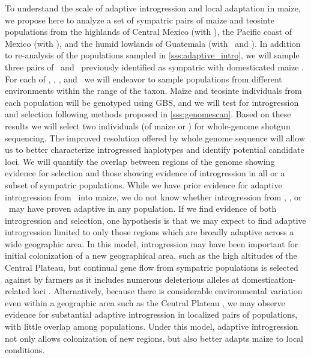 To understand the scale of adaptive introgression and local adaptation in maize, we propose here to analyze a set of sympatric pairs of maize and teosinte populations from the highlands of Central Mexico (with \zm), the Pacific coast of Mexico (with \zp), and the humid lowlands of Guatemala (with \zl\ and \zh). 
In addition to re-analysis of the populations sampled in \ref{sss:adaptive_intro}, we will sample three pairs of \zm\ and \zp\ previously identified as sympatric with domesticated maize \citep{hufford2010genetic, Hufford2013}.  
For each of \zl, \zm, \zp, and \zh\ we will endeavor to sample populations from different environments within the range of the taxon.
Maize and teosinte individuals from each population will be genotyped using GBS, and we will test for introgression and selection following methods proposed in \ref{sss:genomescan}.
Based on these results we will select two individuals (of maize or \zm) for whole-genome shotgun sequencing. 
The improved resolution offered by whole genome sequence will allow us to better characterize introgressed haplotypes and identify potential candidate loci.
We will quantify the overlap between regions of the genome showing evidence for selection and those showing evidence of introgression in all or a subset of sympatric populations.  
While we have prior evidence for adaptive introgression from \zm\ into maize, we do not know whether introgression from \zp, \zl, or \zh\ may have proven adaptive in any population.
If we find evidence of both introgression and selection, one hypothesis is that we may expect to find adaptive introgression limited to only those regions which are broadly adaptive across a wide geographic area. 
In this model, introgression may have been important for initial colonization of a new geographical area, such as the high altitudes of the Central Plateau, but continual gene flow from sympatric populations is selected against by farmers as it includes numerous deleterious alleles at domestication-related loci \citep[c.f.][]{Hufford2013}.
Alternatively, because there is considerable environmental variation even within a geographic area such as the Central Plateau \citep{hufford2012inferences, Pyhajarvi2013}, we may observe evidence for substantial adaptive introgression in localized pairs of populations, with little overlap among populations. 
Under this model, adaptive introgression not only allows colonization of new regions, but also better adapts maize to local conditions.

